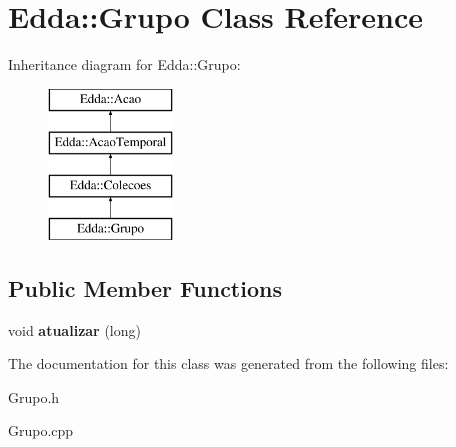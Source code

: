 \hypertarget{class_edda_1_1_grupo}{
\section{Edda::Grupo Class Reference}
\label{class_edda_1_1_grupo}
}
Inheritance diagram for Edda::Grupo:\begin{figure}[H]
\begin{center}
\leavevmode
\includegraphics[height=4.000000cm]{class_edda_1_1_grupo}
\end{center}
\end{figure}
\subsection*{Public Member Functions}
\begin{DoxyCompactItemize}
\item 
\hypertarget{class_edda_1_1_grupo_abb4f5839bebf0dfd801f0e53e316a0a1}{
void {\bfseries atualizar} (long)}
\label{class_edda_1_1_grupo_abb4f5839bebf0dfd801f0e53e316a0a1}

\end{DoxyCompactItemize}


The documentation for this class was generated from the following files:\begin{DoxyCompactItemize}
\item 
Grupo.h\item 
Grupo.cpp\end{DoxyCompactItemize}
